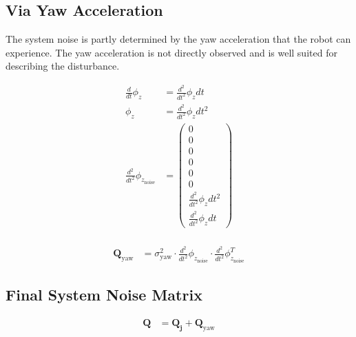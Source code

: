 \documentclass{article}
\begin{document}
\subsection{Via Yaw Acceleration}

The system noise is partly determined by the yaw acceleration that the robot can experience. The yaw acceleration is not directly observed and is well suited for describing the disturbance.

\begin{align}
  \frac{d}{dt}\phi_z &= \frac{d^2}{dt^2}\phi_z dt \\
  \phi_z &= \frac{d^2}{dt^2}\phi_z dt^{2} \\
  \frac{d^2}{dt^2}\phi_{z_\textrm{noise}} &= \left(\begin{matrix}0\\0\\0\\0\\0\\0\\\frac{d^2}{dt^2}\phi_z dt^{2}\\\frac{d^2}{dt^2}\phi_z dt\end{matrix}\right) \\
\end{align}

\begin{align}
  \textbf{Q}_{\textrm{yaw}} &= \sigma^2_{\textrm{yaw}} \cdot \frac{d^2}{dt^2}\phi_{z_\textrm{noise}} \cdot \frac{d^2}{dt^2} \phi_{z_\textrm{noise}}^T
\end{align}

\subsection{Final System Noise Matrix}

\begin{align}
  \textbf{Q} &= \textbf{Q}_{\textbf{j}} + \textbf{Q}_{\textrm{yaw}}
\end{align}
\end{document}
